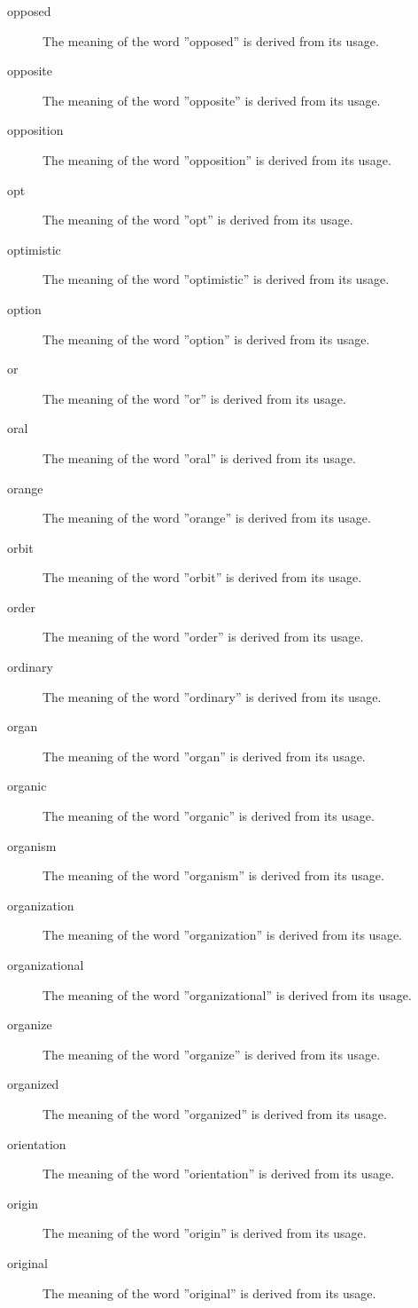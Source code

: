 \documentclass[12pt, letterpaper]{memoir}
\begin{document}
\begin{description}
\item[opposed] The meaning of the word ''opposed'' is derived from its usage.
\item[opposite] The meaning of the word ''opposite'' is derived from its usage.
\item[opposition] The meaning of the word ''opposition'' is derived from its usage.
\item[opt] The meaning of the word ''opt'' is derived from its usage.
\item[optimistic] The meaning of the word ''optimistic'' is derived from its usage.
\item[option] The meaning of the word ''option'' is derived from its usage.
\item[or] The meaning of the word ''or'' is derived from its usage.
\item[oral] The meaning of the word ''oral'' is derived from its usage.
\item[orange] The meaning of the word ''orange'' is derived from its usage.
\item[orbit] The meaning of the word ''orbit'' is derived from its usage.
\item[order] The meaning of the word ''order'' is derived from its usage.
\item[ordinary] The meaning of the word ''ordinary'' is derived from its usage.
\item[organ] The meaning of the word ''organ'' is derived from its usage.
\item[organic] The meaning of the word ''organic'' is derived from its usage.
\item[organism] The meaning of the word ''organism'' is derived from its usage.
\item[organization] The meaning of the word ''organization'' is derived from its usage.
\item[organizational] The meaning of the word ''organizational'' is derived from its usage.
\item[organize] The meaning of the word ''organize'' is derived from its usage.
\item[organized] The meaning of the word ''organized'' is derived from its usage.
\item[orientation] The meaning of the word ''orientation'' is derived from its usage.
\item[origin] The meaning of the word ''origin'' is derived from its usage.
\item[original] The meaning of the word ''original'' is derived from its usage.

\end{description}
\end{document}
